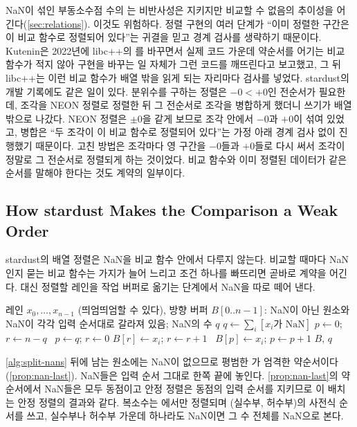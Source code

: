 NaN이 섞인 부동소수점 수의 \code{<}는 비반사성은 지키지만 비교할 수 없음의 추이성을 어긴다(\cref{sec:relations}). 이것도 위험하다. 정렬 구현의 여러 단계가 ``이미 정렬한 구간은 이 비교 함수로 정렬되어 있다''는 귀결을 믿고 경계 검사를 생략하기 때문이다. Kutenin은 2022년에 libc++의 를 바꾸면서 실제 코드 가운데 약순서를 어기는 비교 함수가 적지 않아 구현을 바꾸는 일 자체가 그런 코드를 깨뜨린다고 보고했고\cite{kutenin2022sort}, 그 뒤 libc++는 이런 비교 함수가 배열 밖을 읽게 되는 자리마다 검사를 넣었다. stardust의 개발 기록에도 같은 일이 있다. 분위수를 구하는 정렬은 $-0<+0$인 전순서가 필요한데, 조각을 NEON 정렬로 정렬한 뒤 그 전순서로 조각을 병합하게 했더니 쓰기가 배열 밖으로 나갔다. NEON 정렬은 $\pm0$을 같게 보므로 조각 안에서 $-0$과 $+0$이 섞여 있었고, 병합은 ``두 조각이 이 비교 함수로 정렬되어 있다''는 가정 아래 경계 검사 없이 진행했기 때문이다. 고친 방법은 조각마다 영 구간을 $-0$들과 $+0$들로 다시 써서 조각이 정말로 그 전순서로 정렬되게 하는 것이었다. 비교 함수와 이미 정렬된 데이터가 같은 순서를 말해야 한다는 것도 계약의 일부이다.

\subsection{How stardust Makes the Comparison a Weak Order}

stardust의 배열 정렬은 NaN을 비교 함수 안에서 다루지 않는다. 비교할 때마다 NaN인지 묻는 비교 함수는 가지가 늘어 느리고 조건 하나를 빠뜨리면 곧바로 계약을 어긴다. 대신 정렬할 레인을 작업 버퍼로 옮기는 단계에서 NaN을 따로 떼어 낸다.

\begin{algorithm}[htbp]
\begin{algorithmic}[1]
\Require 레인 $x_0,\dots,x_{n-1}$ (띄엄띄엄할 수 있다), 방향
\Ensure 버퍼 $B[0..n-1]$: NaN이 아닌 원소와 NaN이 각각 입력 순서대로 갈라져 있음; NaN의 수 $q$
\State $q\gets\sum_i[x_i\text{가 NaN}]$ 
 $p\gets0$; $r\gets n-q$ 
\Else\ $p\gets q$; $r\gets0$ 
\EndIf
{} 
   $B[r]\gets x_i$; $r\gets r+1$
  \Else\ $B[p]\gets x_i$; $p\gets p+1$
  \EndIf
\EndFor
\State \Return $B$, $q$ 
\end{algorithmic}
\caption{NaN 떼어 내기 (stardust )}
\label{alg:split-nans}
\end{algorithm}

\cref{alg:split-nans} 뒤에 남는 원소에는 NaN이 없으므로 평범한 \code{<}가 엄격한 약순서이다(\cref{prop:nan-last}). NaN들은 입력 순서 그대로 한쪽 끝에 놓인다. \cref{prop:nan-last}의 약순서에서 NaN들은 모두 동점이고 안정 정렬은 동점의 입력 순서를 지키므로 이 배치는 안정 정렬의 결과와 같다. 복소수는 에서만 정렬되며 (실수부, 허수부)의 사전식 순서를 쓰고, 실수부나 허수부 가운데 하나라도 NaN이면 그 수 전체를 NaN으로 본다.


